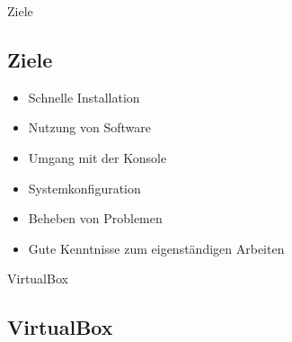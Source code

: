 \begin{frame}{Ziele}
    \subsection{Ziele}\label{subsec:ziele}

    \begin{itemize}
        \item Schnelle Installation
        \item Nutzung von Software
        \item Umgang mit der Konsole
        \item Systemkonfiguration
        \item Beheben von Problemen
        \item Gute Kenntnisse zum eigenständigen Arbeiten
    \end{itemize}

\end{frame}

\begin{frame}{VirtualBox}
    \subsection{VirtualBox}\label{subsec:VirtualBox}

\end{frame}